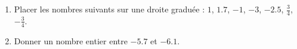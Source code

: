
\begin{exercice}\label{exo2smath-0253}

    \begin{enumerate}
        \item
            Placer les nombres suivants sur une droite graduée : \( 1\), \( 1.7\), \( -1\), \( -3\), \( -2.5\), \( \frac{ 3 }{ 4 }\), \( -\frac{ 3 }{ 4 }\).
        \item
            Donner un nombre entier entre \( -5.7\) et \( -6.1\).
    \end{enumerate}

\end{exercice}
